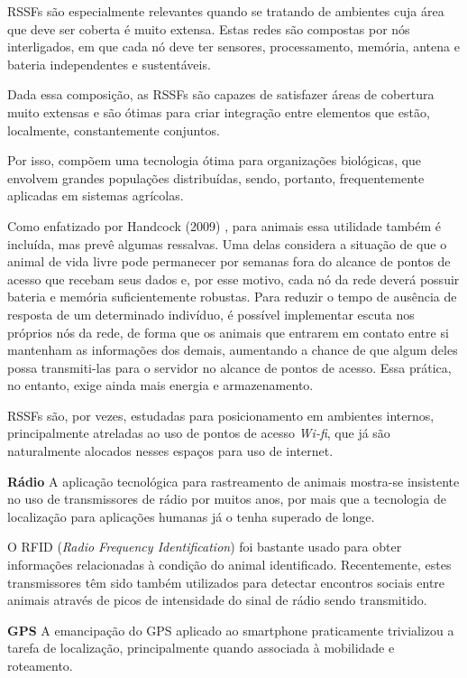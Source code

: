 RSSFs são especialmente relevantes quando se tratando de ambientes cuja área que deve ser coberta é muito extensa. Estas redes são compostas por nós interligados, em que cada nó deve ter sensores, processamento, memória, antena e bateria independentes e sustentáveis.

Dada essa composição, as RSSFs são capazes de satisfazer áreas de cobertura muito extensas e são ótimas para criar integração entre elementos que estão, localmente, constantemente conjuntos.

Por isso, compõem uma tecnologia ótima para organizações biológicas, que envolvem grandes populações distribuídas, sendo, portanto, frequentemente aplicadas em sistemas agrícolas.

Como enfatizado por Handcock (2009) \cite{handcock}, para animais essa utilidade também é incluída, mas prevê algumas ressalvas. Uma delas considera a situação de que o animal de vida livre pode permanecer por semanas fora do alcance de pontos de acesso que recebam seus dados e, por esse motivo, cada nó da rede deverá possuir bateria e memória suficientemente robustas. Para reduzir o tempo de ausência de resposta de um determinado indivíduo, é possível implementar escuta nos próprios nós da rede, de forma que os animais que entrarem em contato entre si mantenham as informações dos demais, aumentando a chance de que algum deles possa transmiti-las para o servidor no alcance de pontos de acesso. Essa prática, no entanto, exige ainda mais energia e armazenamento.

RSSFs são, por vezes, estudadas para posicionamento em ambientes internos, principalmente atreladas ao uso de pontos de acesso \emph{Wi-fi}, que já são naturalmente alocados nesses espaços para uso de internet.

\textbf{Rádio}
A aplicação tecnológica para rastreamento de animais mostra-se insistente no uso de transmissores de rádio por muitos anos, por mais que a tecnologia de localização para aplicações humanas já o tenha superado de longe.

O RFID (\emph{Radio Frequency Identification}) foi bastante usado para obter informações relacionadas à condição do animal identificado. Recentemente, estes transmissores têm sido também utilizados para detectar encontros sociais entre animais através de picos de intensidade do sinal de rádio sendo transmitido.

\textbf{GPS}
A emancipação do GPS aplicado ao smartphone praticamente trivializou a tarefa de localização, principalmente quando associada à mobilidade e roteamento.

